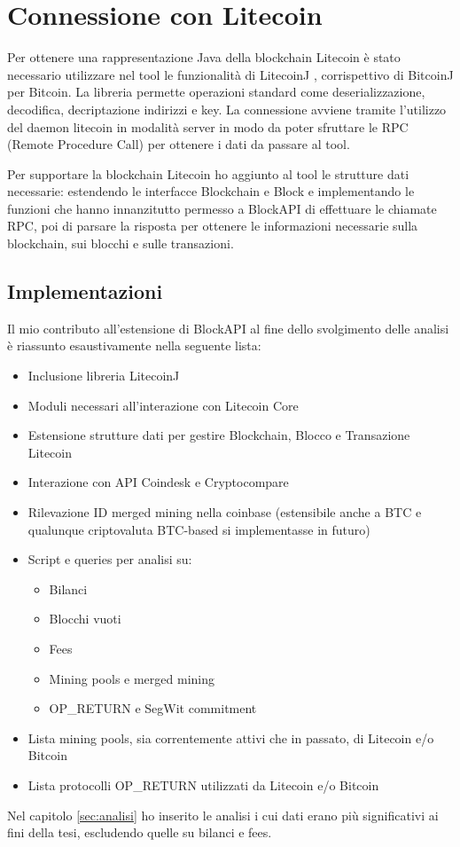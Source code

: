 \section{Connessione con Litecoin}
Per ottenere una rappresentazione Java della blockchain Litecoin è stato necessario utilizzare nel tool le funzionalità di LitecoinJ \cite{litecoinjgithub}, corrispettivo di BitcoinJ per Bitcoin. La libreria permette operazioni standard come deserializzazione, decodifica, decriptazione indirizzi e key.
La connessione avviene tramite l’utilizzo del daemon litecoin in modalità server in modo da poter sfruttare le RPC (Remote Procedure Call) per ottenere i dati da passare al tool.

Per supportare la blockchain Litecoin ho aggiunto al tool le strutture dati necessarie: estendendo le interfacce Blockchain e Block e implementando le funzioni che hanno innanzitutto permesso a BlockAPI di effettuare le chiamate RPC, poi di parsare la risposta per ottenere le informazioni necessarie sulla blockchain, sui blocchi e sulle transazioni.

\subsection{Implementazioni}
Il mio contributo all'estensione di BlockAPI al fine dello svolgimento delle analisi è riassunto esaustivamente nella seguente lista:
\begin{itemize}
\item Inclusione libreria LitecoinJ
\item Moduli necessari all'interazione con Litecoin Core
\item Estensione strutture dati per gestire Blockchain, Blocco e Transazione Litecoin
\item Interazione con API Coindesk e Cryptocompare
\item Rilevazione ID merged mining nella coinbase (estensibile anche a BTC e qualunque criptovaluta BTC-based si implementasse in futuro)
\item Script e queries per analisi su:
\begin{itemize}
\item Bilanci
\item Blocchi vuoti
\item Fees
\item Mining pools e merged mining
\item OP\_RETURN e SegWit commitment
\end{itemize}
\item Lista mining pools, sia correntemente attivi che in passato, di Litecoin e/o Bitcoin
\item Lista protocolli OP\_RETURN utilizzati da Litecoin e/o Bitcoin
\end{itemize}

Nel capitolo \ref{sec:analisi} ho inserito le analisi i cui dati erano più significativi ai fini della tesi, escludendo quelle su bilanci e fees.
